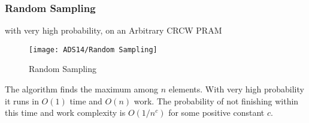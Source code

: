 \subsubsection{Random Sampling}
with very high probability, on an Arbitrary CRCW PRAM

\begin{figure}[!htb]
    \centering
    \texttt{[image: ADS14/Random Sampling]}
    \caption{Random Sampling}
\end{figure}

\begin{theorem}
    The algorithm finds the maximum among $n$ elements.  With very high probability it runs in $O(1)$ time and $O(n)$ work.  The probability of not finishing within this time and work complexity is $O(1/n^c)$ for some positive constant $c$.
\end{theorem}